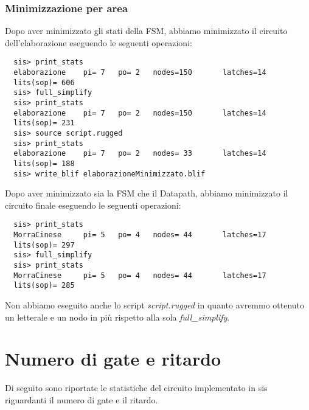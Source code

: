 \documentclass[a4paper]{article}
\begin{document}
\subsubsection{Minimizzazione per area}
Dopo aver minimizzato gli stati della FSM, abbiamo minimizzato il circuito dell'elaborazione eseguendo le
seguenti operazioni:
\begin{lstlisting}
  sis> print_stats
  elaborazione    pi= 7   po= 2   nodes=150       latches=14
  lits(sop)= 606
  sis> full_simplify
  sis> print_stats
  elaborazione    pi= 7   po= 2   nodes=150       latches=14
  lits(sop)= 231
  sis> source script.rugged
  sis> print_stats
  elaborazione    pi= 7   po= 2   nodes= 33       latches=14
  lits(sop)= 188
  sis> write_blif elaborazioneMinimizzato.blif
\end{lstlisting}

\noindent Dopo aver minimizzato sia la FSM che il Datapath, abbiamo minimizzato il circuito finale eseguendo le
seguenti operazioni:
\begin{lstlisting}
  sis> print_stats
  MorraCinese     pi= 5   po= 4   nodes= 44       latches=17
  lits(sop)= 297
  sis> full_simplify
  sis> print_stats
  MorraCinese     pi= 5   po= 4   nodes= 44       latches=17
  lits(sop)= 285
\end{lstlisting}
\noindent Non abbiamo eseguito anche lo script \emph{script.rugged} in quanto avremmo ottenuto un letterale e un nodo
in più rispetto alla sola \emph{full\_simplify}.

\section{Numero di gate e ritardo}
Di seguito sono riportate le statistiche del circuito implementato in sis riguardanti il numero di gate e il ritardo.
\end{document}
